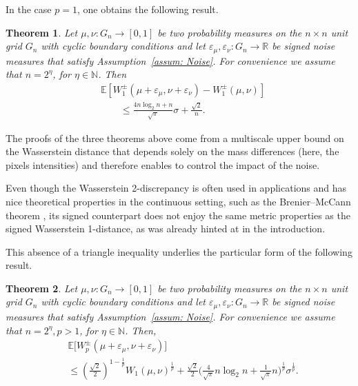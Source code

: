 \documentclass{article}
\theoremstyle{plain}
\newtheorem{thm}{Theorem}[section]
\theoremstyle{definition}
\theoremstyle{remark}
\begin{document}
In the case $p=1$, one obtains the following result.

\begin{thm}
        \label{thm: WavBound}
        Let $\mu, \nu:G_n \to [0,1]$ be two probability measures on the \(n \times n\) unit grid $G_n$ with cyclic boundary conditions and let
        \( \varepsilon_\mu, \varepsilon_\nu : G_n \to \mathbb{R} \) be signed noise measures that satisfy Assumption~\ref{assum: Noise}.
        For convenience we assume that $n=2^\eta$, for $\eta \in \mathbb{N}$.
        Then 
    \begin{align}
            &\mathbb{E}
            \left[
                W^\pm_1(\mu + \varepsilon_\mu,  \nu + \varepsilon_\nu) - W^\pm_1(\mu, \nu)
            \right]
            \\&\qquad\le
            \tfrac{4n \log_2 n + n }{\sqrt{\pi}} \sigma
    +
    \tfrac{\sqrt{2}}{n}. \nonumber
    \end{align}
\end{thm}
The proofs of the three theorems above come from a multiscale upper bound on the Wasserstein distance that depends solely on the mass differences (here, the pixels intensities) and therefore enables to control the impact of the noise.

Even though the Wasserstein 2-discrepancy is often used in applications and has nice theoretical properties in the continuous setting, such as the Brenier--McCann theorem \citep{Brenier1991}, its signed counterpart does not enjoy the same metric properties as the signed Wasserstein 1-distance, as was already hinted at in the introduction. 

This absence of a triangle inequality underlies the particular form of the following result.

\begin{thm}\label{thm: Wp bound between noisy images}
        Let $\mu, \nu:G_n \to [0,1]$ be two probability measures on the \(n \times n\) unit grid $G_n$ with cyclic boundary conditions and let
        \( \varepsilon_\mu, \varepsilon_\nu : G_n \to \mathbb{R} \) be signed noise measures that satisfy Assumption~\ref{assum: Noise}.
        For convenience we assume that $n=2^\eta,p>1$, for $\eta \in \mathbb{N}$.
        Then,
        \begin{align}
            &\mathbb{E}
            \big[
                W_p^\pm(\mu+\varepsilon_\mu,\nu+\varepsilon_\nu)
            \big]
            \\
            &\le
            \left(\tfrac{\sqrt2}{2}\right)^{1-\frac1p} W_1(\mu,\nu)^{\frac1p} 
            + 
            \tfrac{\sqrt2}{2}\bigg(\tfrac{4}{\sqrt{\pi}} n\log_2 n+
            \tfrac{1}{\sqrt\pi} n 
            \bigg)^{\tfrac1p}\sigma^{\frac1p}. \nonumber
        \end{align}
\end{thm}
\end{document}
